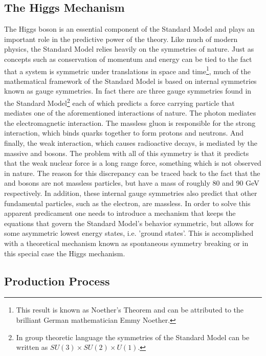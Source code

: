\subsection{The Higgs Mechanism}
\label{subsec:higgsmec}
The Higgs boson is an essential component of the Standard Model and plays
an important role in the predictive power of the theory. Like much of modern
physics, the Standard Model relies heavily on the symmetries of nature. Just
as concepts such as conservation of momentum and energy can be tied to the 
fact that a system is symmetric under translations in space and time\footnote{
This result is known as Noether's Theorem and can be attributed to the 
brilliant German mathematician Emmy Noether.}, much of the mathematical 
framework of the Standard Model is based on internal symmetries 
known as gauge symmetries. In fact there are three gauge symmetries found
in the Standard Model\footnote{ In group theoretic language the symmetries of
the Standard Model can be written as $SU(3) \times SU(2) \times U(1)$.} 
each of which predicts a force carrying particle that mediates one of the 
aforementioned interactions of nature. The photon mediates the 
electromagnetic interaction. The massless gluon is responsible for the strong 
interaction, which binds quarks together to form protons and neutrons.
And finally, the weak interaction, which causes radioactive decays, 
is mediated by the massive \WBosons and \ZBoson bosons. The problem with all 
of this symmetry is that it predicts that the weak nuclear force is a long
range force, something which is not observed in nature. The reason for this
discrepancy can be traced back to the fact that the \WBoson and \ZBoson bosons are
not massless particles, but have a mass of roughly 80 and 90 GeV respectively. 
In addition, these internal gauge symmetries also predict that other 
fundamental particles, such as the electron, are massless. In order to solve
this apparent predicament one needs to introduce a mechanism that keeps the
equations that govern the Standard Model's behavior symmetric, but allows for
some asymmetric lowest energy states, i.e. 'ground states'. 
This is accomplished with a theoretical mechanism known as spontaneous
symmetry breaking or in this special case the Higgs mechanism.

\subsection{Production Process}
\label{subsec:prodproc}

